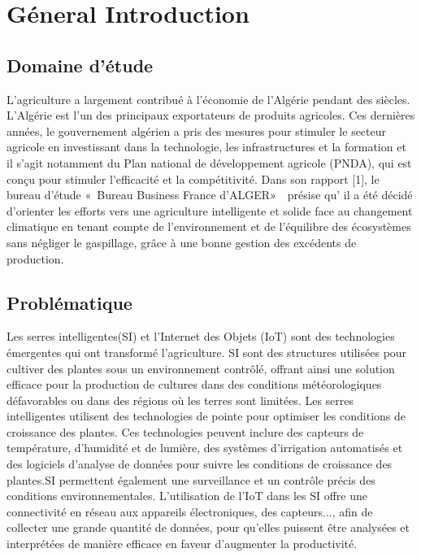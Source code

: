 \chapter*{Géneral Introduction} 
\label{chap:introduction} 


\section*{Domaine d'étude}

L’agriculture a largement contribué à l’économie de l’Algérie pendant des siècles. L’Algérie
est l’un des principaux exportateurs de produits agricoles. Ces dernières années, le
gouvernement algérien a pris des mesures pour stimuler le secteur agricole en investissant
dans la technologie, les infrastructures et la formation et il s’agit notamment du Plan
national de développement agricole (PNDA), qui est conçu pour stimuler l’efficacité et
la compétitivité. Dans son rapport [1], le bureau d’étude « Bureau Business France d’ALGER»  présise qu’ il a été décidé d’orienter les efforts vers une agriculture intelligente et solide face au changement climatique en tenant compte de l’environnement et de l’équilibre des écosystèmes sans négliger le gaspillage, grâce à une bonne gestion des excédents de production.


\section*{Problématique }
Les serres intelligentes(SI) et l’Internet des Objets (IoT) sont des technologies émergentes
qui ont transformé l’agriculture. SI sont des structures utilisées pour cultiver des plantes
sous un environnement contrôlé, offrant ainsi une solution efficace pour la production
de cultures dans des conditions météorologiques défavorables ou dans des régions où les
terres sont limitées.
Les serres intelligentes utilisent des technologies de pointe pour optimiser les conditions
de croissance des plantes. Ces technologies peuvent inclure des capteurs de température,
d’humidité et de lumière, des systèmes d’irrigation automatisés et des logiciels d’analyse
de données pour suivre les conditions de croissance des plantes.SI permettent également
une surveillance et un contrôle précis des conditions environnementales.
L’utilisation de l’IoT dans les SI offre une connectivité en réseau aux appareils électroniques, des capteurs..., afin de collecter une grande quantité de données, pour qu’elles puissent être analysées et interprétées de manière efficace en faveur d’augmenter la productivité.

